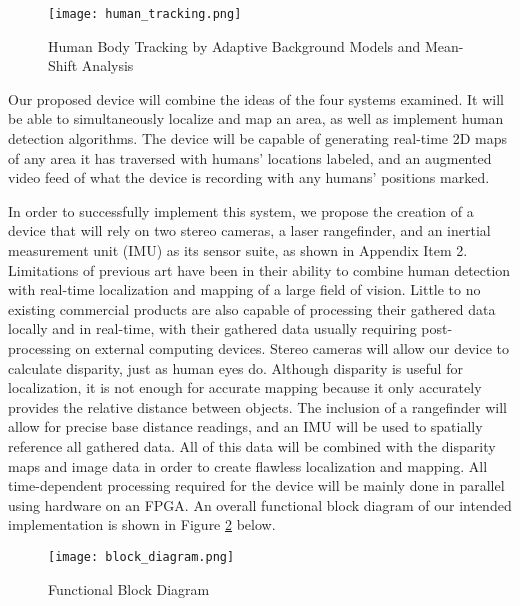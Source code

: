 \begin{figure}[H]
	\centerline{\texttt{[image: human\_tracking.png]}}
	\caption{\small{Human Body Tracking by Adaptive Background Models and Mean-Shift Analysis \cite{porikli}}}
	\label{human_tracking}
\end{figure}

Our proposed device will combine the ideas of the four systems examined. It will be able to simultaneously localize and map an area, as well as implement human detection algorithms. The device will be capable of generating real-time 2D maps of any area it has traversed with humans' locations labeled, and an augmented video feed of what the device is recording with any humans' positions marked.
\par
In order to successfully implement this system, we propose the creation of a device that will rely on two stereo cameras, a laser rangefinder, and an inertial measurement unit (IMU) as its sensor suite, as shown in Appendix Item 2. Limitations of previous art have been in their ability to combine human detection with real-time localization and mapping of a large field of vision. Little to no existing commercial products are also capable of processing their gathered data locally and in real-time, with their gathered data usually requiring post-processing on external computing devices. Stereo cameras will allow our device to calculate disparity, just as human eyes do. Although disparity is useful for localization, it is not enough for accurate mapping because it only accurately provides the relative distance between objects. The inclusion of a rangefinder will allow for precise base distance readings, and an IMU will be used to spatially reference all gathered data. All of this data will be combined with the disparity maps and image data in order to create flawless localization and mapping. All time-dependent processing required for the device will be mainly done in parallel using hardware on an FPGA. An overall functional block diagram of our intended implementation is shown in Figure \ref{orig_bd} below.

\begin{figure}[H]
	\centerline{\texttt{[image: block\_diagram.png]}}
	\caption{Functional Block Diagram}
	\label{orig_bd}
\end{figure}

